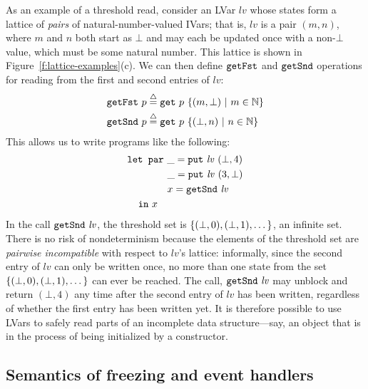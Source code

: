 \documentclass{article}
\begin{document}
As an example of a threshold read, consider an LVar $\mathit{lv}$
whose states form a lattice of \emph{pairs} of natural-number-valued
IVars; that is, $\mathit{lv}$ is a pair $(m, n)$, where $m$ and $n$
both start as $\bot$ and may each be updated once with a non-$\bot$
value, which must be some natural number.  This lattice is shown in
Figure~\ref{f:lattice-examples}(c).  We can then define $\mbox{\texttt{getFst}}$ and
$\mbox{\texttt{getSnd}}$ operations for reading from the first and second entries of
$\mathit{lv}$:
\begin{align*}
\mbox{\texttt{getFst}}~p & \stackrel{\triangle}{=} \mbox{\texttt{get}}~p~\lbrace (m, \bot) \ | \  m \in
    \mathbb{N} \rbrace \\
\mbox{\texttt{getSnd}}~p & \stackrel{\triangle}{=} \mbox{\texttt{get}}~p~\lbrace (\bot, n) \ | \  n \in
    \mathbb{N} \rbrace
\end{align*}
This allows us to write programs like the following:
\begin{equation*}
\begin{split}
& \mbox{\texttt{\mbox{\texttt{let}}~\mbox{\texttt{par}}}} ~\_ = \mbox{\texttt{put}}~\mathit{lv}~(\bot, 4) \\
&  \hspace{3.7em} ~\_ = \mbox{\texttt{put}}~\mathit{lv}~(3, \bot) \\
&  \hspace{3.7em} ~x = \mbox{\texttt{getSnd}}~\mathit{lv} \\
&  \hspace{1.1em} \mbox{\texttt{in}}~x
\end{split}
\label{e:lvar-example-4}
\end{equation*}
In the call $\mbox{\texttt{getSnd}}~\mathit{lv}$, the threshold set is
$\left\{(\bot, 0), (\bot, 1), \dots\right\}$, an infinite set.  There is no
risk of nondeterminism because the elements of the threshold set are
\emph{pairwise incompatible} with respect to $\mathit{lv}$'s lattice:
informally, since the second entry of $\mathit{lv}$ can only be
written once, no more than one state from the set $\left\{(\bot, 0),
  (\bot, 1), \dots\right\}$ can ever be reached.  The call,
$\mbox{\texttt{getSnd}}~\mathit{lv}$ may unblock and return $(\bot, 4)$ any time
after the second entry of $\mathit{lv}$ has been written, regardless
of whether the first entry has been written yet.  It is therefore
possible to use LVars to safely read parts of an incomplete data
structure---say, an object that is in the process of being initialized
by a constructor.

\subsection{Semantics of freezing and event handlers}
\end{document}
